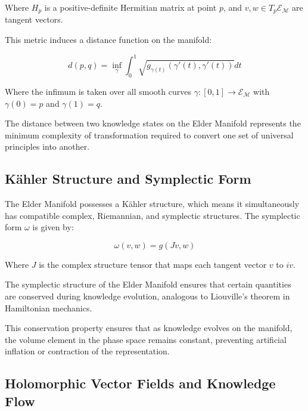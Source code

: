 Where $H_p$ is a positive-definite Hermitian matrix at point $p$, and $v, w \in T_p\mathcal{E}_{\mathcal{M}}$ are tangent vectors.

This metric induces a distance function on the manifold:

\begin{equation}
d(p, q) = \inf_{\gamma} \int_0^1 \sqrt{g_{\gamma(t)}(\gamma'(t), \gamma'(t))} dt
\end{equation}

Where the infimum is taken over all smooth curves $\gamma: [0,1] \rightarrow \mathcal{E}_{\mathcal{M}}$ with $\gamma(0) = p$ and $\gamma(1) = q$.

\begin{proposition}
The distance between two knowledge states on the Elder Manifold represents the minimum complexity of transformation required to convert one set of universal principles into another.
\end{proposition}

\subsection{Kähler Structure and Symplectic Form}

The Elder Manifold possesses a Kähler structure, which means it simultaneously has compatible complex, Riemannian, and symplectic structures. The symplectic form $\omega$ is given by:

\begin{equation}
\omega(v, w) = g(Jv, w)
\end{equation}

Where $J$ is the complex structure tensor that maps each tangent vector $v$ to $iv$.

\begin{theorem}
The symplectic structure of the Elder Manifold ensures that certain quantities are conserved during knowledge evolution, analogous to Liouville's theorem in Hamiltonian mechanics.
\end{theorem}

This conservation property ensures that as knowledge evolves on the manifold, the volume element in the phase space remains constant, preventing artificial inflation or contraction of the representation.

\subsection{Holomorphic Vector Fields and Knowledge Flow}

